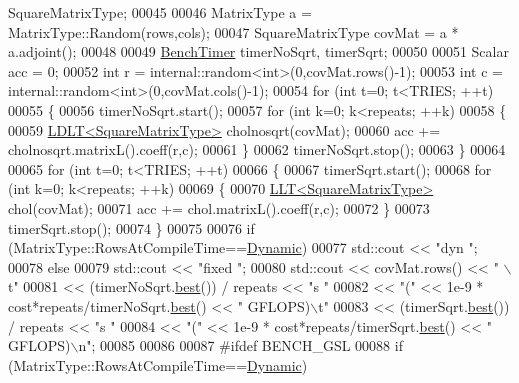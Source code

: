 \begin{DoxyCode}
       SquareMatrixType;
00045 
00046   MatrixType a = MatrixType::Random(rows,cols);
00047   SquareMatrixType covMat =  a * a.adjoint();
00048 
00049   \hyperlink{class_eigen_1_1_bench_timer}{BenchTimer} timerNoSqrt, timerSqrt;
00050 
00051   Scalar acc = 0;
00052   \textcolor{keywordtype}{int} r = internal::random<int>(0,covMat.rows()-1);
00053   \textcolor{keywordtype}{int} c = internal::random<int>(0,covMat.cols()-1);
00054   \textcolor{keywordflow}{for} (\textcolor{keywordtype}{int} t=0; t<TRIES; ++t)
00055   \{
00056     timerNoSqrt.start();
00057     \textcolor{keywordflow}{for} (\textcolor{keywordtype}{int} k=0; k<repeats; ++k)
00058     \{
00059       \hyperlink{group___cholesky___module_class_eigen_1_1_l_d_l_t}{LDLT<SquareMatrixType>} cholnosqrt(covMat);
00060       acc += cholnosqrt.matrixL().coeff(r,c);
00061     \}
00062     timerNoSqrt.stop();
00063   \}
00064 
00065   \textcolor{keywordflow}{for} (\textcolor{keywordtype}{int} t=0; t<TRIES; ++t)
00066   \{
00067     timerSqrt.start();
00068     \textcolor{keywordflow}{for} (\textcolor{keywordtype}{int} k=0; k<repeats; ++k)
00069     \{
00070       \hyperlink{group___cholesky___module_class_eigen_1_1_l_l_t}{LLT<SquareMatrixType>} chol(covMat);
00071       acc += chol.matrixL().coeff(r,c);
00072     \}
00073     timerSqrt.stop();
00074   \}
00075 
00076   \textcolor{keywordflow}{if} (MatrixType::RowsAtCompileTime==\hyperlink{namespace_eigen_ad81fa7195215a0ce30017dfac309f0b2}{Dynamic})
00077     std::cout << \textcolor{stringliteral}{"dyn   "};
00078   \textcolor{keywordflow}{else}
00079     std::cout << \textcolor{stringliteral}{"fixed "};
00080   std::cout << covMat.rows() << \textcolor{stringliteral}{" \(\backslash\)t"}
00081             << (timerNoSqrt.\hyperlink{class_eigen_1_1_bench_timer_ae8b673b0fa356d3432c7a65c79e8af0e}{best}()) / repeats << \textcolor{stringliteral}{"s "}
00082             << \textcolor{stringliteral}{"("} << 1e-9 * cost*repeats/timerNoSqrt.\hyperlink{class_eigen_1_1_bench_timer_ae8b673b0fa356d3432c7a65c79e8af0e}{best}() << \textcolor{stringliteral}{" GFLOPS)\(\backslash\)t"}
00083             << (timerSqrt.\hyperlink{class_eigen_1_1_bench_timer_ae8b673b0fa356d3432c7a65c79e8af0e}{best}()) / repeats << \textcolor{stringliteral}{"s "}
00084             << \textcolor{stringliteral}{"("} << 1e-9 * cost*repeats/timerSqrt.\hyperlink{class_eigen_1_1_bench_timer_ae8b673b0fa356d3432c7a65c79e8af0e}{best}() << \textcolor{stringliteral}{" GFLOPS)\(\backslash\)n"};
00085 
00086 
00087 \textcolor{preprocessor}{  #ifdef BENCH\_GSL}
00088   \textcolor{keywordflow}{if} (MatrixType::RowsAtCompileTime==\hyperlink{namespace_eigen_ad81fa7195215a0ce30017dfac309f0b2}{Dynamic})

\end{DoxyCode}

